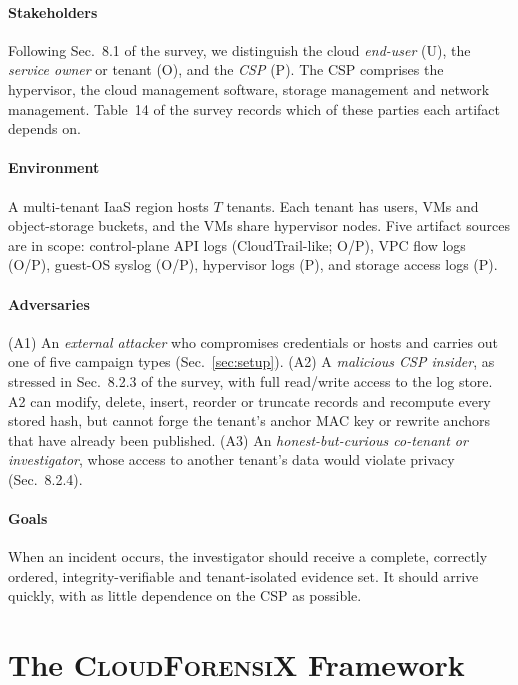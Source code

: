 \documentclass[conference,10pt]{IEEEtran}
\newcommand{\ours}{\textsc{CloudForensiX}}
\begin{document}
\paragraph*{Stakeholders} Following Sec.~8.1 of the survey, we distinguish the cloud \emph{end-user} (U), the \emph{service owner} or tenant (O), and the \emph{CSP} (P). The CSP comprises the hypervisor, the cloud management software, storage management and network management. Table~14 of the survey records which of these parties each artifact depends on.

\paragraph*{Environment} A multi-tenant IaaS region hosts $T$ tenants. Each tenant has users, VMs and object-storage buckets, and the VMs share hypervisor nodes. Five artifact sources are in scope: control-plane API logs (CloudTrail-like; O/P), VPC flow logs (O/P), guest-OS syslog (O/P), hypervisor logs (P), and storage access logs (P).

\paragraph*{Adversaries}
(A1) An \emph{external attacker} who compromises credentials or hosts and carries out one of five campaign types (Sec.~\ref{sec:setup}).
(A2) A \emph{malicious CSP insider}, as stressed in Sec.~8.2.3 of the survey, with full read/write access to the log store. A2 can modify, delete, insert, reorder or truncate records and recompute every stored hash, but cannot forge the tenant's anchor MAC key or rewrite anchors that have already been published.
(A3) An \emph{honest-but-curious co-tenant or investigator}, whose access to another tenant's data would violate privacy (Sec.~8.2.4).

\paragraph*{Goals} When an incident occurs, the investigator should receive a complete, correctly ordered, integrity-verifiable and tenant-isolated evidence set. It should arrive quickly, with as little dependence on the CSP as possible.

\section{The \ours{} Framework}
\label{sec:design}
\end{document}
